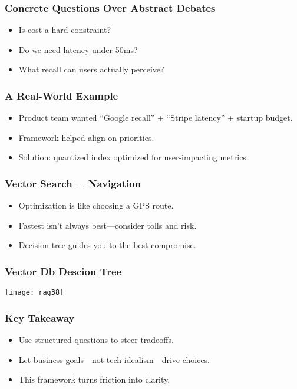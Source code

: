 \begin{frame}[fragile]\frametitle{Concrete Questions Over Abstract Debates}
\begin{itemize}
    \item Is cost a hard constraint?
    \item Do we need latency under 50ms?
    \item What recall can users actually perceive?
\end{itemize}
\end{frame}

\begin{frame}[fragile]\frametitle{A Real-World Example}
\begin{itemize}
    \item Product team wanted ``Google recall'' + ``Stripe latency'' + startup budget.
    \item Framework helped align on priorities.
    \item Solution: quantized index optimized for user-impacting metrics.
\end{itemize}
\end{frame}

\begin{frame}[fragile]\frametitle{Vector Search = Navigation}
\begin{itemize}
    \item Optimization is like choosing a GPS route.
    \item Fastest isn’t always best—consider tolls and risk.
    \item Decision tree guides you to the best compromise.
\end{itemize}
\end{frame}

\begin{frame}[fragile]\frametitle{Vector Db Descion Tree}
		\begin{center}
		\texttt{[image: rag38]}
		\end{center}
\end{frame}

\begin{frame}[fragile]\frametitle{Key Takeaway}
\begin{itemize}
    \item Use structured questions to steer tradeoffs.
    \item Let business goals—not tech idealism—drive choices.
    \item This framework turns friction into clarity.
\end{itemize}
\end{frame}



